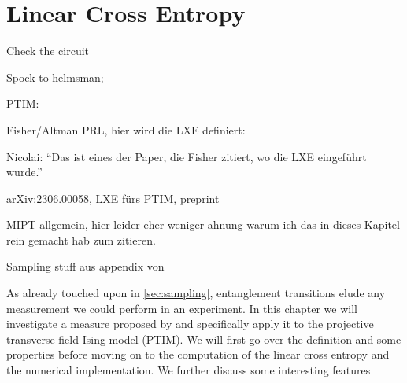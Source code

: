 \chapter{Linear Cross Entropy}
\label{ch:lxe}
\epigraph{Check the circuit}{Spock to helmsman;
--- }

PTIM: \cite{langEntanglementTransitionProjective2020}

Fisher/Altman PRL, hier wird die LXE definiert: \cite{liCrossEntropyBenchmark2023}

Nicolai: \enquote{Das ist eines der Paper, die Fisher zitiert, wo die LXE eingeführt wurde.} \cite{baoSymmetryEnrichedPhases2021}

arXiv:2306.00058, LXE fürs PTIM, preprint \cite{tikhanovskayaUniversalityCrossEntropy2023}

MIPT allgemein, hier leider eher weniger ahnung warum ich das in dieses Kapitel rein
gemacht hab zum zitieren. \cite{baoTheoryPhaseTransition2020}

Sampling stuff aus appendix von \cite{roserDecodingProjectiveTransverse2023}

As already touched upon in \cref{sec:sampling}, entanglement transitions elude
any measurement we could perform in an experiment. In this chapter we will
investigate a measure proposed by \citeauthor{liCrossEntropyBenchmark2023} and
specifically apply it to the projective transverse-field Ising model (PTIM). We
will first go over the definition and some properties before moving on to the
computation of the linear cross entropy and the numerical implementation. We
further discuss some interesting features

